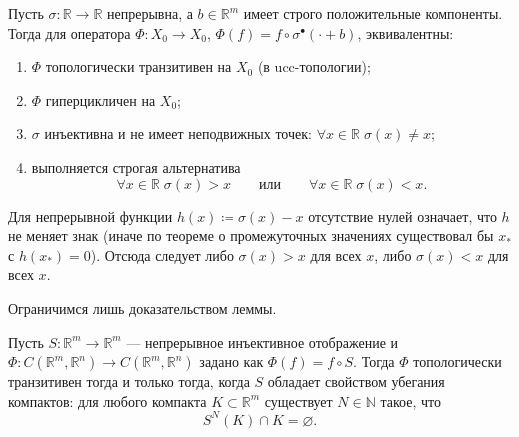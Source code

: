 \documentclass[../NDCNNAI_main.tex]{subfiles}
\begin{document}
\begin{theorem}
Пусть $\sigma\colon \mathbb{R}\to\mathbb{R}$ непрерывна, а $b\in\mathbb{R}^m$ имеет строго положительные компоненты.
Тогда для оператора $\Phi\colon X_0\to X_0$, $\Phi(f)=f\circ\sigma^\bullet(\cdot+b)$, эквивалентны:
\begin{enumerate}
\item $\Phi$ топологически транзитивен на $X_0$ (в ucc-топологии);
\item $\Phi$ гиперцикличен на $X_0$;
\item $\sigma$ инъективна и не имеет неподвижных точек: $\forall x\in\mathbb{R}\;\sigma(x)\neq x$;
\item выполняется строгая альтернатива
\[
\forall x\in\mathbb{R}\;\sigma(x)>x
\qquad \text{или} \qquad
\forall x\in\mathbb{R}\;\sigma(x)<x.
\]
\end{enumerate}
\end{theorem}

\begin{remark}
Для непрерывной функции $h(x)\coloneq \sigma(x)-x$ отсутствие нулей означает, что $h$ не меняет знак
(иначе по теореме о промежуточных значениях существовал бы $x_\ast$ с $h(x_\ast)=0$).
Отсюда следует либо $\sigma(x)>x$ для всех $x$, либо $\sigma(x)<x$ для всех $x$.
\end{remark}

Ограничимся лишь доказательством леммы.
\begin{lemma}
Пусть $S\colon \mathbb{R}^m\to\mathbb{R}^m$ --- непрерывное инъективное отображение и
$\Phi\colon C(\mathbb{R}^m,\mathbb{R}^n)\to C(\mathbb{R}^m,\mathbb{R}^n)$ задано как $\Phi(f)=f\circ S$.
Тогда $\Phi$ топологически транзитивен тогда и только тогда, когда $S$ обладает свойством убегания компактов:
для любого компакта $K\subset\mathbb{R}^m$ существует $N\in\mathbb{N}$ такое, что
\begin{equation}
S^{N}(K)\cap K=\varnothing.
\label{eq:runaway}
\end{equation}
\end{lemma}
\end{document}
